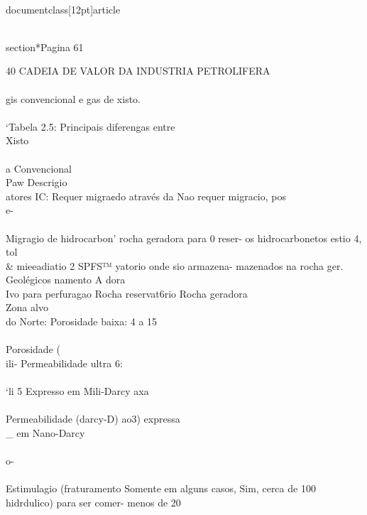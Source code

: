 \\documentclass[12pt]{article}
\begin{document}
\\section*{Pagina 61}

40 CADEIA DE VALOR DA INDUSTRIA PETROLIFERA\\
\\
gis convencional e gas de xisto.\\
\\
‘Tabela 2.5: Principais diferengas entre\\
Xisto\\
\\
a Convencional\\
Paw Descrigio\\
atores IC: Requer migra¢do através da Nao requer migracio, pos\\
e-\\
\\
Migragio de hidrocarbon' rocha geradora para 0 reser- os hidrocarbonetos estio 4,\\
tol \\& mieeadiatio 2 SPFS™ yatorio onde sio armazena- mazenados na rocha ger.\\
Geolégicos namento A dora\\
Ivo para perfuragao Rocha reservat6rio Rocha geradora\\
Zona alvo\\
do Norte: Porosidade baixa: 4 a 15\\%
\\%
Porosidade (\\%
ili- Permeabilidade ultra 6:\\
\\
‘li 5 Expresso em Mili-Darcy axa\\
\\
Permeabilidade (darcy-D) ao3) expressa\\_ em Nano-Darcy\\
\\
o-\\%
\\
Estimulagio (fraturamento Somente em alguns casos, Sim, cerca de 100\\%
hidrdulico) para ser comer- menos de 20\\%
\\
\end{document}
